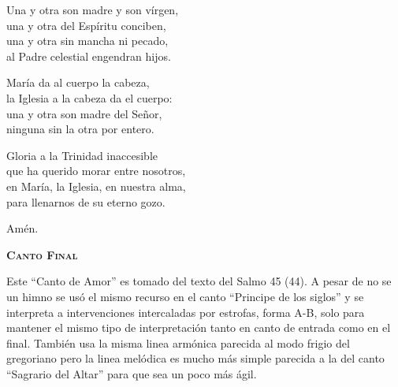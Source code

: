 \documentclass[12pt, letterpaper]{report}
\begin{document}
    \noindent
    Una y otra son madre y son v\'irgen,\\
    una y otra del Esp\'iritu conciben,\\
    una y otra sin mancha ni pecado,\\
    al Padre celestial engendran hijos.

    \noindent
    Mar\'ia da al cuerpo la cabeza,\\
    la Iglesia a la cabeza da el cuerpo:\\
    una y otra son madre del Se\~nor,\\
    ninguna sin la otra por entero.

    \noindent
    Gloria a la Trinidad inaccesible\\
    que ha querido morar entre nosotros,\\
    en Mar\'ia, la Iglesia, en nuestra alma,\\
    para llenarnos de su eterno gozo.

    \noindent
    Am\'en.
    \clearpage




    \begin{center}
        {\scshape \Huge {\bfseries Canto Final}}
    \end{center}

    \Large Este ``Canto de Amor'' es tomado del texto del Salmo 45 (44). A pesar de no se un himno se us\'o
    el mismo recurso en el canto ``Principe de los siglos'' y se interpreta a intervenciones intercaladas
    por estrofas, forma A-B, solo para mantener el mismo tipo de interpretaci\'on tanto en canto de entrada
    como en el final. Tambi\'en usa la misma linea arm\'onica parecida al modo frigio del gregoriano pero la
    linea mel\'odica es mucho m\'as simple parecida a la del canto ``Sagrario del Altar'' para que sea un poco
    m\'as \'agil.
\end{document}
